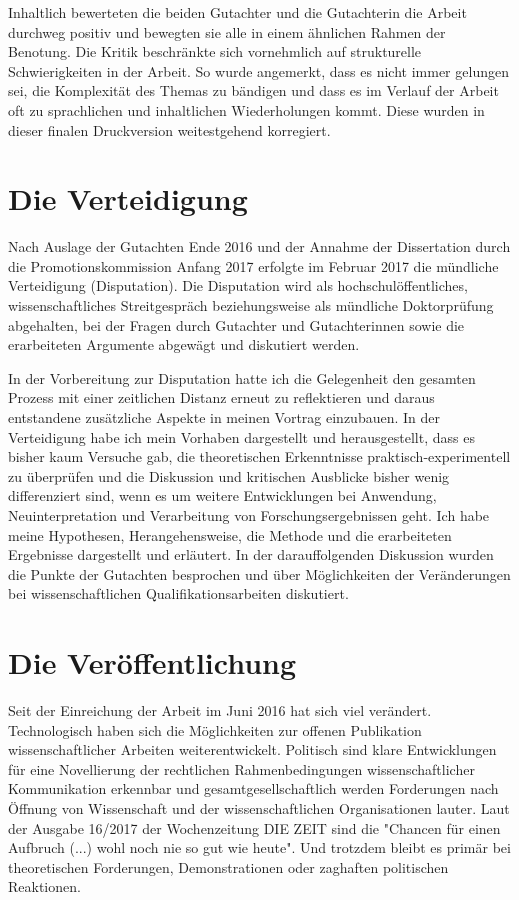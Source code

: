 Inhaltlich bewerteten die beiden Gutachter und die Gutachterin die Arbeit durchweg positiv und bewegten sie alle in einem ähnlichen Rahmen der Benotung. Die Kritik beschränkte sich vornehmlich auf strukturelle Schwierigkeiten in der Arbeit. So wurde angemerkt, dass es nicht immer gelungen sei, die Komplexität des Themas zu bändigen und dass es im Verlauf der Arbeit oft zu sprachlichen und inhaltlichen Wiederholungen kommt. Diese wurden in dieser finalen Druckversion weitestgehend korregiert.

\section{Die Verteidigung}

Nach Auslage der Gutachten Ende 2016 und der Annahme der Dissertation durch die Promotionskommission Anfang 2017 erfolgte im Februar 2017 die mündliche Verteidigung (Disputation). Die Disputation wird als hochschulöffentliches, wissenschaftliches Streitgespräch beziehungsweise als mündliche Doktorprüfung abgehalten, bei der Fragen durch Gutachter und Gutachterinnen sowie die erarbeiteten Argumente abgewägt und diskutiert werden.

In der Vorbereitung zur Disputation hatte ich die Gelegenheit den gesamten Prozess mit einer zeitlichen Distanz erneut zu reflektieren und daraus entstandene zusätzliche Aspekte in meinen Vortrag einzubauen. In der Verteidigung habe ich mein Vorhaben dargestellt und herausgestellt, dass es bisher kaum Versuche gab, die theoretischen Erkenntnisse praktisch-experimentell zu überprüfen und die Diskussion und kritischen Ausblicke bisher wenig differenziert sind, wenn es um weitere Entwicklungen bei Anwendung, Neuinterpretation und Verarbeitung von Forschungsergebnissen geht. Ich habe meine Hypothesen, Herangehensweise, die Methode und die erarbeiteten Ergebnisse dargestellt und erläutert. In der darauffolgenden Diskussion wurden die Punkte der Gutachten besprochen und über Möglichkeiten der Veränderungen bei wissenschaftlichen Qualifikationsarbeiten diskutiert.

\section{Die Veröffentlichung}

Seit der Einreichung der Arbeit im Juni 2016 hat sich viel verändert. Technologisch haben sich die Möglichkeiten zur offenen Publikation wissenschaftlicher Arbeiten weiterentwickelt. Politisch sind klare Entwicklungen für eine Novellierung der rechtlichen Rahmenbedingungen wissenschaftlicher Kommunikation erkennbar und gesamtgesellschaftlich werden Forderungen nach Öffnung von Wissenschaft und der wissenschaftlichen Organisationen lauter. Laut der Ausgabe 16/2017 der Wochenzeitung DIE ZEIT sind die "Chancen für einen Aufbruch (...) wohl noch nie so gut wie heute". Und trotzdem bleibt es primär bei theoretischen Forderungen, Demonstrationen oder zaghaften politischen Reaktionen.

